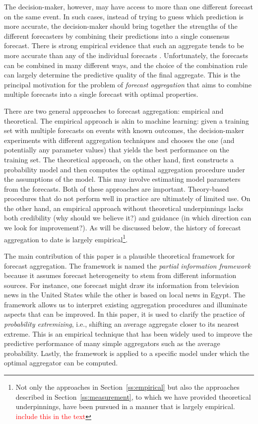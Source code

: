 \documentclass[12pt]{article}
\theoremstyle{definition}
\theoremstyle{definition}
\begin{document}
The decision-maker, however, may have access to more than one different forecast on the same event. In such cases, instead of trying to guess which prediction is more accurate, the decision-maker should bring together the strengths of the different forecasters by combining their predictions into a single consensus forecast. There is strong empirical evidence that such an aggregate tends to be more accurate than any of the individual forecasts \citep{clemen1989combining,
armstrong2001combining}. Unfortunately, the forecasts can be combined in many different ways, and the choice of the combination
rule can largely determine the predictive quality of the final
aggregate.  
This is the principal motivation for the problem of  \textit{forecast aggregation} that aims to combine multiple forecasts into a single
forecast with optimal properties.

There are two general approaches to forecast aggregation: empirical
and theoretical.  The empirical approach is akin to machine
learning: given a training set with multiple forecasts on events with
known outcomes, the decision-maker experiments with different
aggregation techniques and chooses the one (and potentially any
parameter values) that yields the best performance on the training set.
The theoretical approach, on the other hand, first constructs a
probability model and then computes the optimal aggregation procedure
under the assumptions of the model.  This may involve estimating model
parameters from the forecasts. Both of these approaches are important.  Theory-based procedures that do not
perform well in practice are ultimately of limited use.  On the other
hand, an empirical approach without theoretical underpinnings lacks
both credibility (why should we believe it?)  and guidance (in which
direction can we look for improvement?). As will be discussed below, the history of forecast aggregation to date is largely
empirical\footnote{Not only the approaches in
Section~\ref{ss:empirical} but also the approaches described in
Section~\ref{ss:measurement}, to which we have provided theoretical
underpinnings, have been pursued in a manner that is largely
empirical. \textcolor{red}{include this in the text}}. 

The main contribution of this paper is a plausible
theoretical framework for forecast aggregation. The framework is named the \textit{partial information framework} because it assumes forecast heterogeneity to stem from different information sources. For instance, one forecast might draw its information from television news in the United States
while the other is based on local news in Egypt.
 The framework allows
us to interpret existing aggregation procedures and illuminate aspects
that can be improved. In this paper, it is used to clarify the practice of {\em probability
extremizing}, i.e., shifting an average aggregate closer to its nearest
extreme. This is an empirical technique that has been widely used to
improve the predictive performance of many simple aggregators such as
the average probability. Lastly, the framework is applied to a
specific model under which the optimal aggregator can be computed.
\end{document}

